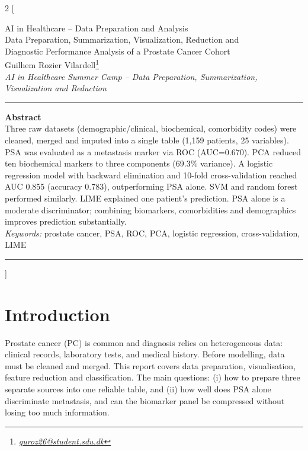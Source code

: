 ﻿\documentclass[a4paper,10pt]{article}
\begin{document}
\begin{multicols*}{2}
[
\begin{center}
\vspace*{0mm}
{\large
AI in Healthcare – Data Preparation and Analysis \\
\vspace{3mm}
Data Preparation, Summarization, Visualization, Reduction and \\
Diagnostic Performance Analysis of a Prostate Cancer Cohort
}\\
\vspace{8mm}
Guilhem Rozier Vilardell\footnote{\textit{\href{mailto:guroz26@student.sdu.dk}{guroz26@student.sdu.dk}}}
\\
\vspace{3mm}
\footnotesize{
\textit{AI in Healthcare Summer Camp – Data Preparation, Summarization, Visualization and Reduction}
}\\
\vspace{9mm}
\end{center}
\rule{\linewidth}{0.4pt}
\onehalfspacing
\textbf{Abstract}\\
Three raw datasets (demographic/clinical, biochemical, comorbidity codes) were cleaned, merged and imputed into a single table (1,159 patients, 25 variables). PSA was evaluated as a metastasis marker via ROC (AUC=0.670). PCA reduced ten biochemical markers to three components (69.3\% variance). A logistic regression model with backward elimination and 10-fold cross-validation reached AUC 0.855 (accuracy 0.783), outperforming PSA alone. SVM and random forest performed similarly. LIME explained one patient's prediction. PSA alone is a moderate discriminator; combining biomarkers, comorbidities and demographics improves prediction substantially.\\
\noindent\textit{Keywords:} prostate cancer, PSA, ROC, PCA, logistic regression, cross-validation, LIME\\
\rule{\linewidth}{0.4pt}
]
\singlespacing

\tableofcontents

\setlength{\parskip}{1pt}
\columnbreak

\section{Introduction}
Prostate cancer (PC) is common and diagnosis relies on heterogeneous data: clinical records, laboratory tests, and medical history. Before modelling, data must be cleaned and merged. This report covers data preparation, visualisation, feature reduction and classification. The main questions: (i) how to prepare three separate sources into one reliable table, and (ii) how well does PSA alone discriminate metastasis, and can the biomarker panel be compressed without losing too much information.


\end{multicols*}
\end{document}
